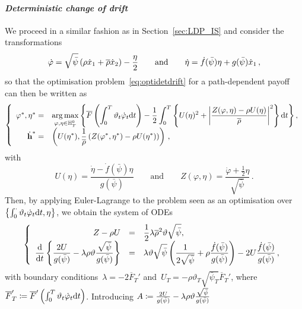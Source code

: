 \paragraph{\textit{Deterministic change of drift}}
We proceed in a similar fashion as in Section~\ref{sec:LDP_IS} and consider the  transformations
$$
\dot{\varphi} = \sqrt{\bar\psi}\left( \rho\dot{x}_1 + \overline{\rho}\dot{x}_2 \right) - \frac{\eta}{2} \qquad \text{and} \qquad \dot{\eta} = \dot{f}(\bar\psi)\eta + g(\bar\psi)\dot{x}_1\,,
$$
so that the optimisation problem~\eqref{eq:optidetdrift} for a path-dependent payoff can then be written as
\begin{equation}\label{eq:optidetdriftapplication}
\left\{
\begin{array}{rl}
\varphi^{*}, \eta^{*} = & \displaystyle  \operatorname*{arg\,max}\limits_{\varphi,\eta \in \mathbb{H}_T^0} \left\{ \overline{F}\left(\int_0^T \vartheta_t \dot{\varphi}_t \mathrm{d} t \right) 
- \frac{1}{2}\int_0^T \left\{U(\eta)^2 + \left|\frac{Z(\varphi,\eta) - \rho U(\eta)}{\overline{\rho}}\right|^2\right \}\mathrm{d} t \right\},\\
\dot{\boldsymbol{\mathrm{h}}}^{*}  = & \displaystyle 
\left(U(\eta^{*}),  \frac{1}{\overline{\rho}}\left(Z(\varphi^{*}, \eta^{*}) - \rho U(\eta^{*})\right)\right)\,,
\end{array}
\right.
\end{equation}
with
$$
U(\eta) = \frac{\dot{\eta} - \dot{f}(\bar\psi)\eta}{g(\bar\psi)}
\qquad\text{and}\qquad
Z(\varphi, \eta) = \frac{\dot{\varphi} + \frac{1}{2}\eta}{\sqrt{\bar\psi}}\,. 
$$
Then, by applying Euler-Lagrange to the problem seen as an optimisation over~$\left \{\int_0^\cdot \vartheta_t\dot{\varphi}_t\mathrm{d} t,\eta\right \}$, we obtain the system of ODEs
\begin{equation*}
\left\{
\begin{array}{rcl}
Z - \rho U &=& \displaystyle \frac{1}{2}\lambda\overline{\rho}^2\vartheta \sqrt{\bar\psi},\\
\displaystyle \frac{\mathrm{d}}{\mathrm{d} t}\left\{\frac{2U}{g(\bar\psi)} - \lambda \rho \vartheta \frac{\sqrt{\bar\psi}}{g(\bar\psi)}\right\} &=& \displaystyle \lambda \vartheta \sqrt{\bar\psi} \left(\frac{1}{2\sqrt{\bar\psi}} + \rho \frac{\dot{f}(\bar\psi)}{g(\bar\psi)} \right) -2U\frac{\dot{f}(\bar\psi)}{g(\bar\psi)}\,,
\end{array}
\right.
\end{equation*}
with boundary conditions~$\lambda = - 2\overline{F}_T'$ and~$U_T = -\rho\vartheta_T\sqrt{\bar\psi_T}\overline{F}_T'$, where~$\overline{F}_T'\coloneqq \overline{F}'\left(\int_0^T\vartheta_t\dot{\varphi}_t\mathrm{d} t\right)$. 
Introducing
$A \coloneqq \frac{2U}{g(\bar\psi)} - \lambda \rho \vartheta \frac{\sqrt{\bar\psi}}{g(\bar\psi)}$
